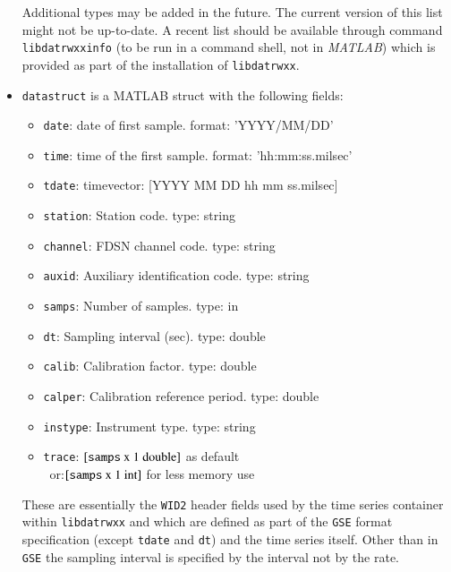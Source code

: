 \documentclass[10pt, a4paper, titlepage=false]{scrartcl}
\begin{document}
\begin{itemize}
Additional types may be added in the future.
The current version of this list might not be up-to-date.
A recent list should be available through command \texttt{libdatrwxxinfo}
(to be run in a command shell, not in \emph{MATLAB})
which is provided as part of the installation of \texttt{libdatrwxx}.
\item \texttt{datastruct} is a MATLAB struct with the following fields:
\begin{itemize}
\item \texttt{date}: date of first sample. format: 'YYYY/MM/DD'
\item \texttt{time}: time of the first sample. format: 'hh:mm:ss.milsec'
\item \texttt{tdate}: timevector: [YYYY MM DD hh mm ss.milsec]
\item \texttt{station}: Station code. type: string
\item \texttt{channel}: FDSN channel code. type: string
\item \texttt{auxid}: Auxiliary identification code. type: string
\item \texttt{samps}: Number of samples. type: in
\item \texttt{dt}: Sampling interval (sec). type: double
\item \texttt{calib}: Calibration factor. type: double
\item \texttt{calper}: Calibration reference period. type: double
\item \texttt{instype}: Instrument type. type: string
\item \texttt{trace}: $ \left[\text{\texttt{samps} x 1 double}\right]$ as
default\\
\qquad$\,$ or:\qquad$\left[\text{\texttt{samps} x 1 int}\right]$ for less memory use
\end{itemize}
These are essentially the \texttt{WID2} header fields used by the time series
container within \texttt{libdatrwxx} and which are defined as part of the
\texttt{GSE} format specification (except \texttt{tdate} and \texttt{dt}) and
the time series itself.
Other than in \texttt{GSE} the sampling interval is specified by the interval
not by the rate.
\end{itemize}
\end{document}

